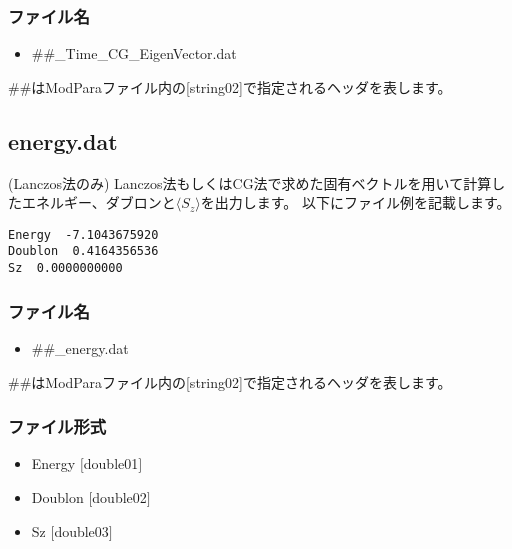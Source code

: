 \subsubsection{ファイル名}
\begin{itemize}
   \item  \#\#\_Time\_CG\_EigenVector.dat
 \end{itemize}
  \#\#はModParaファイル内の[string02]で指定されるヘッダを表します。


\newpage
\subsection{energy.dat}
\label{subsec:energy.dat}
(Lanczos法のみ) Lanczos法もしくはCG法で求めた固有ベクトルを用いて計算したエネルギー、ダブロン{と$\langle S_z \rangle$}を出力します。
以下にファイル例を記載します。\\

\begin{minipage}{12.5cm}
\begin{screen}
\begin{verbatim}
Energy  -7.1043675920 
Doublon  0.4164356536 
Sz  0.0000000000 
\end{verbatim}
\end{screen}
\end{minipage}

\subsubsection{ファイル名}
\begin{itemize}
   \item  \#\#\_energy.dat
 \end{itemize}
  \#\#はModParaファイル内の[string02]で指定されるヘッダを表します。


\subsubsection{ファイル形式}
 \begin{itemize}
   \item Energy $[$double01$]$
   \item Doublon $[$double02$]$
   \item Sz $[$double03$]$
  \end{itemize}
